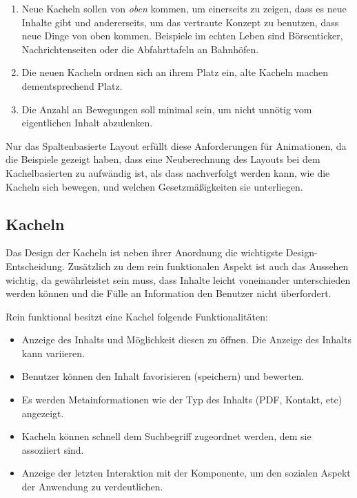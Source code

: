 \documentclass[12pt,twoside]{book}
\begin{document}
\begin{enumerate}
  \item Neue Kacheln sollen von \textit{oben} kommen, um einerseits zu zeigen, dass es neue Inhalte gibt und andererseits, um das vertraute Konzept zu benutzen, dass neue Dinge von oben kommen. Beispiele im echten Leben sind Börsenticker, Nachrichtenseiten oder die Abfahrttafeln an Bahnhöfen.

  \item Die neuen Kacheln ordnen sich an ihrem Platz ein, alte Kacheln machen dementsprechend Platz.
  \item Die Anzahl an Bewegungen soll minimal sein, um nicht unnötig vom eigentlichen Inhalt abzulenken.
\end{enumerate}

Nur das Spaltenbasierte Layout erfüllt diese Anforderungen für Animationen, da die Beispiele gezeigt haben, dass eine Neuberechnung des Layouts bei dem Kachelbasierten zu aufwändig ist, als dass nachverfolgt werden kann, wie die Kacheln sich bewegen, und welchen Gesetzmäßigkeiten sie unterliegen.

\subsection{Kacheln}\label{sec:tiles}

Das Design der Kacheln ist neben ihrer Anordnung die wichtigste Design-Entscheidung. Zusätzlich zu dem rein funktionalen Aspekt ist auch das Aussehen wichtig, da gewährleistet sein muss, dass Inhalte leicht voneinander unterschieden werden können und die Fülle an Information den Benutzer nicht überfordert.

Rein funktional besitzt eine Kachel folgende Funktionalitäten:

\begin{itemize}
  \item Anzeige des Inhalts und Möglichkeit diesen zu öffnen. Die Anzeige des Inhalts kann variieren.
  \item Benutzer können den Inhalt favorisieren (speichern) und bewerten.
  \item Es werden Metainformationen wie der Typ des Inhalts (PDF, Kontakt, etc) angezeigt.
  \item Kacheln können schnell dem Suchbegriff zugeordnet werden, dem sie assoziiert sind.
  \item Anzeige der letzten Interaktion mit der Komponente, um den sozialen Aspekt der Anwendung zu verdeutlichen.
\end{itemize}
\end{document}
